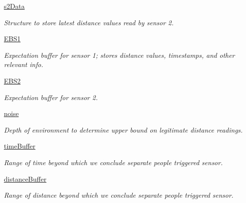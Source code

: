 \begin{DoxyCompactItemize}
\mbox{\hyperlink{class_data_filter_1_1_data_filter_a8c4508633e4146d7552e7cc7a8329717}{s2\+Data}}
\begin{DoxyCompactList}\small\item\em Structure to store latest distance values read by sensor 2. \end{DoxyCompactList}\item 
\mbox{\label{class_data_filter_1_1_data_filter_a366cd6f9f50cb14b36c4db06520acd1b}} 
\mbox{\hyperlink{class_data_filter_1_1_data_filter_a366cd6f9f50cb14b36c4db06520acd1b}{E\+B\+S1}}
\begin{DoxyCompactList}\small\item\em Expectation buffer for sensor 1; stores distance values, timestamps, and other relevant info. \end{DoxyCompactList}\item 
\mbox{\label{class_data_filter_1_1_data_filter_ae4f6d96d9cf2726c077d31a0457009c5}} 
\mbox{\hyperlink{class_data_filter_1_1_data_filter_ae4f6d96d9cf2726c077d31a0457009c5}{E\+B\+S2}}
\begin{DoxyCompactList}\small\item\em Expectation buffer for sensor 2. \end{DoxyCompactList}\item 
\mbox{\label{class_data_filter_1_1_data_filter_a995c23055bc575f0fa3cf25584ca2f97}} 
\mbox{\hyperlink{class_data_filter_1_1_data_filter_a995c23055bc575f0fa3cf25584ca2f97}{noise}}
\begin{DoxyCompactList}\small\item\em Depth of environment to determine upper bound on legitimate distance readings. \end{DoxyCompactList}\item 
\mbox{\label{class_data_filter_1_1_data_filter_aed08d319cdf84ec98cc220bb866695da}} 
\mbox{\hyperlink{class_data_filter_1_1_data_filter_aed08d319cdf84ec98cc220bb866695da}{time\+Buffer}}
\begin{DoxyCompactList}\small\item\em Range of time beyond which we conclude separate people triggered sensor. \end{DoxyCompactList}\item 
\mbox{\label{class_data_filter_1_1_data_filter_a54efa3bad5ef62cbd98b4a54303f70a6}} 
\mbox{\hyperlink{class_data_filter_1_1_data_filter_a54efa3bad5ef62cbd98b4a54303f70a6}{distance\+Buffer}}
\begin{DoxyCompactList}\small\item\em Range of distance beyond which we conclude separate people triggered sensor. \end{DoxyCompactList}\end{DoxyCompactItemize}


